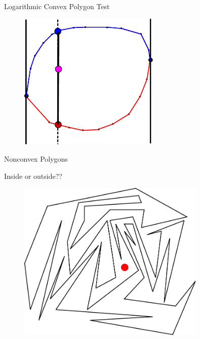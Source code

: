 \documentclass{beamer}
\begin{document}
\begin{frame}{Logarithmic Convex Polygon Test}

\begin{figure}[t]
	\centering
	\includegraphics[width=0.6\textwidth]{ConvexPolygonCastLinesIntersect.pdf}
\end{figure}

\end{frame}



\begin{frame}{Nonconvex Polygons}

Inside or outside??

\begin{figure}[t]
	\centering
	\includegraphics[width=0.8\textwidth]{SimplePolygon1.pdf}
\end{figure}

\end{frame}
\end{document}
